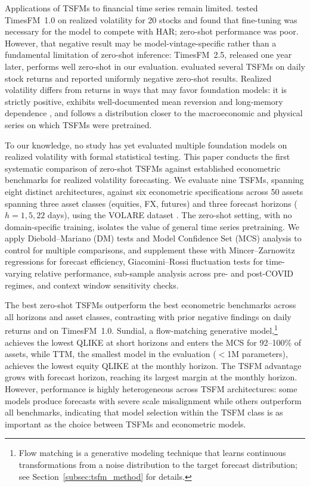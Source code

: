 \documentclass[12pt]{article}
\begin{document}
Applications of TSFMs to financial time series remain limited. \citet{goel2025rv} tested TimesFM~1.0 on realized volatility for 20 stocks and found that fine-tuning was necessary for the model to compete with HAR; zero-shot performance was poor. However, that negative result may be model-vintage-specific rather than a fundamental limitation of zero-shot inference: TimesFM~2.5, released one year later, performs well zero-shot in our evaluation. \citet{rahimikia2025revisiting} evaluated several TSFMs on daily stock returns and reported uniformly negative zero-shot results. Realized volatility differs from returns in ways that may favor foundation models: it is strictly positive, exhibits well-documented mean reversion and long-memory dependence \citep{andersen2001exchange, andersen2003}, and follows a distribution closer to the macroeconomic and physical series on which TSFMs were pretrained.

To our knowledge, no study has yet evaluated multiple foundation models on realized volatility with formal statistical testing. This paper conducts the first systematic comparison of zero-shot TSFMs against established econometric benchmarks for realized volatility forecasting. We evaluate nine TSFMs, spanning eight distinct architectures, against six econometric specifications across 50 assets spanning three asset classes (equities, FX, futures) and three forecast horizons ($h = 1, 5, 22$ days), using the VOLARE dataset \citep{volare2026}. The zero-shot setting, with no domain-specific training, isolates the value of general time series pretraining. We apply Diebold--Mariano (DM) tests \citep{diebold1995} and Model Confidence Set (MCS) analysis \citep{hansen2011mcs} to control for multiple comparisons, and supplement these with Mincer--Zarnowitz regressions \citep{mincer1969} for forecast efficiency, Giacomini--Rossi fluctuation tests \citep{giacomini2010} for time-varying relative performance, sub-sample analysis across pre- and post-COVID regimes, and context window sensitivity checks.

The best zero-shot TSFMs outperform the best econometric benchmarks across all horizons and asset classes, contrasting with prior negative findings on daily returns and on TimesFM~1.0. Sundial, a flow-matching generative model,\footnote{Flow matching is a generative modeling technique that learns continuous transformations from a noise distribution to the target forecast distribution; see Section~\ref{subsec:tsfm_method} for details.} achieves the lowest QLIKE at short horizons and enters the MCS for 92--100\% of assets, while TTM, the smallest model in the evaluation ($<$1M parameters), achieves the lowest equity QLIKE at the monthly horizon. The TSFM advantage grows with forecast horizon, reaching its largest margin at the monthly horizon. However, performance is highly heterogeneous across TSFM architectures: some models produce forecasts with severe scale misalignment while others outperform all benchmarks, indicating that model selection within the TSFM class is as important as the choice between TSFMs and econometric models.
\end{document}
